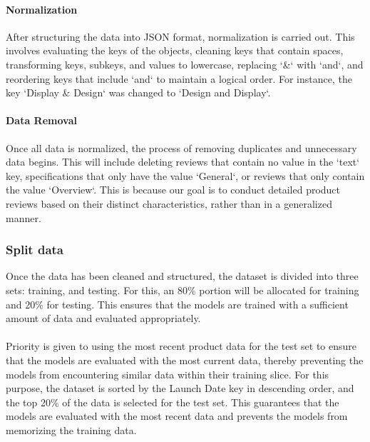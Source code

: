 \paragraph{Normalization}
After structuring the data into JSON format, normalization is carried out. This involves evaluating the keys of the objects, cleaning keys that contain spaces, transforming keys, subkeys, and values to lowercase, replacing `\&` with `and`, and reordering keys that include `and` to maintain a logical order. For instance, the key `Display \& Design` was changed to `Design and Display`.

\paragraph{Data Removal}
Once all data is normalized, the process of removing duplicates and unnecessary data begins. This will include deleting reviews that contain no value in the `text` key, specifications that only have the value `General`, or reviews that only contain the value `Overview`. This is because our goal is to conduct detailed product reviews based on their distinct characteristics, rather than in a generalized manner.

\subsubsection{Split data}
Once the data has been cleaned and structured, the dataset is divided into three sets: training, and testing. For this, an 80\% portion will be allocated for training and 20\% for testing. This ensures that the models are trained with a sufficient amount of data and evaluated appropriately.
\\\\
Priority is given to using the most recent product data for the test set to ensure that the models are evaluated with the most current data, thereby preventing the models from encountering similar data within their training slice. For this purpose, the dataset is sorted by the Launch Date key in descending order, and the top 20\% of the data is selected for the test set. This guarantees that the models are evaluated with the most recent data and prevents the models from memorizing the training data.

